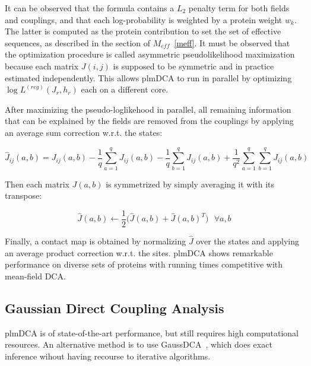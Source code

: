         It can be observed that the formula contains a $L_2$ penalty term for both fields and couplings,
        and that each log-probability is weighted by a protein weight $w_k$.
        The latter is computed as the protein contribution to set the set of effective sequences,
        as described in the section of $M_{eff}$~\ref{meff}.
        It must be observed that the optimization procedure is called asymmetric pseudolikelihood maximization because
        each matrix $J(i, j)$ is supposed to be symmetric and in practice estimated independently.
        This allows plmDCA to run in parallel by optimizing $\log{L^{(reg)}}(J_r, h_r)$ each on a different core.

        After maximizing the pseudo-loglikehood in parallel, all remaining information
        that can be explained by the fields are removed from the couplings by applying
        an average sum correction w.r.t. the states:

        \begin{equation}
            \hat{J}_{ij}(a, b) = J_{ij}(a, b) - \frac{1}{q} \sum\limits_{a=1}^q J_{ij}(a, b) - \frac{1}{q} \sum\limits_{b=1}^q J_{ij}(a, b)
            + \frac{1}{q^2} \sum\limits_{a=1}^q \sum\limits_{b=1}^q J_{ij}(a, b)
        \end{equation}

        Then each matrix $J(a, b)$ is symmetrized by simply averaging it with its transpose:

        \begin{equation}
            \hat{J}(a, b) \leftarrow \frac{1}{2} \big( \hat{J}(a, b) + \hat{J}(a, b)^T \big) \ \ \ \forall a, b
        \end{equation}

        Finally, a contact map is obtained by normalizing $\hat{J}$ over the states and applying an average product correction w.r.t. the sites.
        plmDCA shows remarkable performance on diverse sets of proteins with running times competitive with mean-field DCA.


    \subsection{Gaussian Direct Coupling Analysis}

        plmDCA is of state-of-the-art performance, but still requires high computational resources.
        An alternative method is to use GaussDCA~\cite{10.1371/journal.pone.0092721}, which does
        exact inference wihout having recourse to iterative algorithms.

